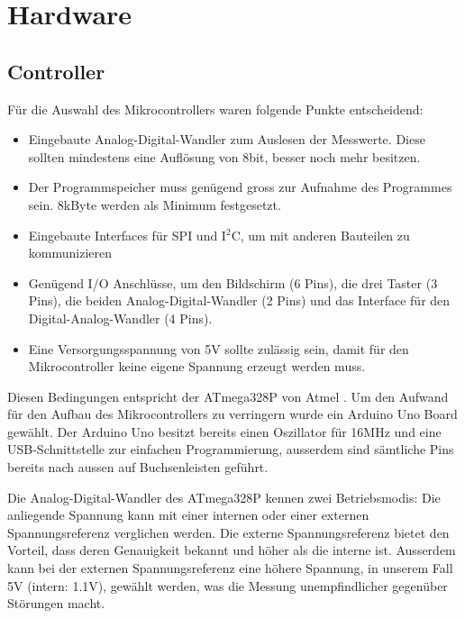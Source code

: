 \section{Hardware}

\subsection{Controller}

Für die Auswahl des Mikrocontrollers waren folgende Punkte entscheidend:
\begin{itemize}
	\item Eingebaute Analog-Digital-Wandler zum Auslesen der Messwerte. Diese sollten mindestens eine Auflösung von 8bit, besser noch mehr besitzen.
	\item Der Programmspeicher muss genügend gross zur Aufnahme des Programmes sein. 8kByte werden als Minimum festgesetzt.
	\item Eingebaute Interfaces für SPI und I$^2$C, um mit anderen Bauteilen zu kommunizieren
	\item Genügend I/O Anschlüsse, um den Bildschirm (6 Pins), die drei Taster (3 Pins), die beiden Analog-Digital-Wandler (2 Pins) und das Interface für den Digital-Analog-Wandler (4 Pins).
	\item Eine Versorgungsspannung von 5V sollte zulässig sein, damit für den Mikrocontroller keine eigene Spannung erzeugt werden muss.
\end{itemize}

Diesen Bedingungen entspricht der ATmega328P von Atmel \cite{db_atmega}. Um den Aufwand für den Aufbau des Mikrocontrollers zu verringern wurde ein Arduino Uno Board gewählt. Der Arduino Uno besitzt bereits einen Oszillator für 16MHz und eine USB-Schnittstelle zur einfachen Programmierung, ausserdem sind sämtliche Pins bereits nach aussen auf Buchsenleisten geführt.

Die Analog-Digital-Wandler des ATmega328P kennen zwei Betriebsmodis: Die anliegende Spannung kann mit einer internen oder einer externen Spannungsreferenz verglichen werden. Die externe Spannungsreferenz bietet den Vorteil, dass deren Genauigkeit bekannt und höher als die interne ist. Ausserdem kann bei der externen Spannungsreferenz eine höhere Spannung, in unserem Fall 5V (intern: 1.1V), gewählt werden, was die Messung unempfindlicher gegenüber Störungen macht.